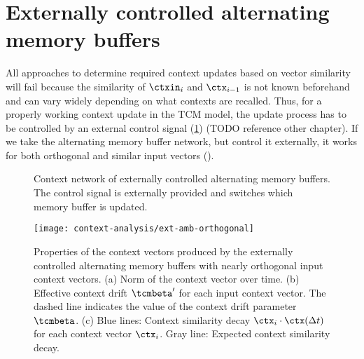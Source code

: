 \section{Externally controlled alternating memory buffers}
All approaches to determine required context updates based on vector similarity will fail because the similarity of $\ctxin_i$ and $\ctx_{i-1}$ is not known beforehand and can vary widely depending on what contexts are recalled.
Thus, for a properly working context update in the TCM model, the update process has to be controlled by an external control signal (\cref{fig:ctx-ext-amb}) (TODO reference other chapter).
If we take the alternating memory buffer network, but control it externally, it works for both orthogonal and similar input vectors ().
\begin{figure}
    \centering
    \caption{Context network of externally controlled alternating memory buffers. The control signal  is externally provided and switches which memory buffer is updated.}\label{fig:ctx-ext-amb}
\end{figure}
\begin{figure}
    \centering
    \texttt{[image: context-analysis/ext-amb-orthogonal]}
    \caption{
        Properties of the context vectors produced by the externally controlled alternating memory buffers with nearly orthogonal input context vectors.
        (a) Norm of the context vector over time.
        (b) Effective context drift $\tcmbeta'$ for each input context vector. The dashed line indicates the value of the context drift parameter $\tcmbeta$.
        (c) Blue lines: Context similarity decay $\ctx_i \cdot \ctx(\Delta t)$ for each context vector $\ctx_i$. Gray line: Expected context similarity decay.
    }\label{fig:ext-amb-orthogonal}
\end{figure}
